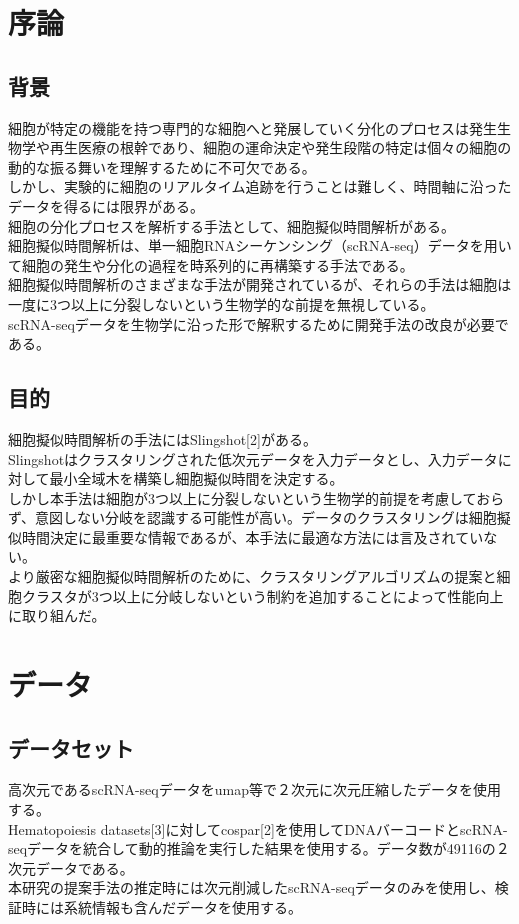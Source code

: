 \documentclass{article}
\begin{document}
\section{序論}
\subsection{背景}
細胞が特定の機能を持つ専門的な細胞へと発展していく分化のプロセスは発生生物学や再生医療の根幹であり、細胞の運命決定や発生段階の特定は個々の細胞の動的な振る舞いを理解するために不可欠である。\\しかし、実験的に細胞のリアルタイム追跡を行うことは難しく、時間軸に沿ったデータを得るには限界がある。\\細胞の分化プロセスを解析する手法として、細胞擬似時間解析がある。\\細胞擬似時間解析は、単一細胞RNAシーケンシング（scRNA-seq）データを用いて細胞の発生や分化の過程を時系列的に再構築する手法である。\\細胞擬似時間解析のさまざまな手法が開発されているが、それらの手法は細胞は一度に3つ以上に分裂しないという生物学的な前提を無視している。\\scRNA-seqデータを生物学に沿った形で解釈するために開発手法の改良が必要である。

\subsection{目的}
細胞擬似時間解析の手法にはSlingshot[2]がある。\\Slingshotはクラスタリングされた低次元データを入力データとし、入力データに対して最小全域木を構築し細胞擬似時間を決定する。\\しかし本手法は細胞が3つ以上に分裂しないという生物学的前提を考慮しておらず、意図しない分岐を認識する可能性が高い。データのクラスタリングは細胞擬似時間決定に最重要な情報であるが、本手法に最適な方法には言及されていない。\\
より厳密な細胞擬似時間解析のために、クラスタリングアルゴリズムの提案と細胞クラスタが3つ以上に分岐しないという制約を追加することによって性能向上に取り組んだ。

\section{データ}
\subsection{データセット}
高次元であるscRNA-seqデータをumap等で２次元に次元圧縮したデータを使用する。\\Hematopoiesis datasets[3]に対してcospar[2]を使用してDNAバーコードとscRNA-seqデータを統合して動的推論を実行した結果を使用する。データ数が49116の２次元データである。\\本研究の提案手法の推定時には次元削減したscRNA-seqデータのみを使用し、検証時には系統情報も含んだデータを使用する。
\end{document}
